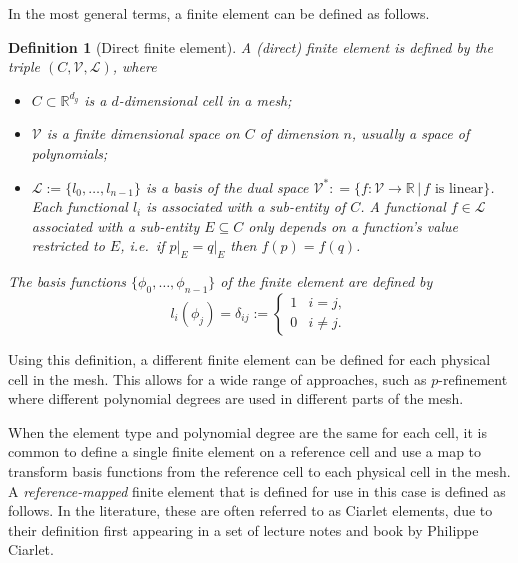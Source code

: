 \documentclass[sn-mathphys-num]{sn-jnl}%
\theoremstyle{thmstyleone}%
\newcommand{\subentity}{E}
\newcommand{\cell}{C}
\newcommand{\polyspace}{\mathcal{V}}
\newcommand{\dualbasis}{\mathcal{L}}
\newcommand{\dual}[1]{#1^*}
\theoremstyle{thmstyletwo}%
\theoremstyle{thmstylethree}%
\newtheorem{definition}{Definition}%
\begin{document}
In the most general terms, a finite element can be defined as follows.

\begin{definition}[Direct finite element]\label{def:direct}
A (direct) finite element is defined by the triple
$(\cell,\polyspace,\dualbasis)$, where
\begin{itemize}
  \item $\cell\subset\mathbb{R}^{d_g}$ is a $d$-dimensional cell in a mesh;
  \item $\polyspace$ is a finite dimensional space on $\cell$
  of dimension $n$, usually a space of polynomials;
  \item $\dualbasis :=\{l_0,\dots,l_{n-1}\}$ is a basis of the dual space
  $\dual{\polyspace} : =\{f:\polyspace\to\mathbb{R}\,|\,f\text{ is linear}\}$.
   Each functional $l_i$ is associated with a sub-entity of $\cell$. A functional
  $f\in\dualbasis$ associated with a sub-entity $\subentity\subseteq\cell$ only depends on a function's value
  restricted to $\subentity$, i.e.~if $\left.p\right|_{\subentity}=\left.q\right|_{\subentity}$ then $f(p)=f(q)$.
\end{itemize}

The basis functions $\{\phi_0,\dots,\phi_{n-1}\}$ of the finite element are
defined by
%
\[
  l_i(\phi_j)=\delta_{ij}:=\begin{cases}
  1&i=j,\\
  0&i\not=j.
\end{cases}
\]
\end{definition}

Using this definition, a different finite element can be defined for each physical cell in the mesh.
This allows for a wide range of approaches, such as $p$-refinement where different polynomial degrees
are used in different parts of the mesh.

When the element type and polynomial degree are the same for each cell, it is common to define
a single finite element on a reference cell and use a map to transform basis functions from the
reference cell to each physical cell in the mesh. A \emph{reference-mapped} finite element
that is defined for use in this case is defined as follows. In the literature, these are
often referred to as Ciarlet elements, due to their definition first appearing in
a set of lecture notes \cite{CiarletLectureNotes} and book \cite{ciarlet} by Philippe Ciarlet.
\end{document}
